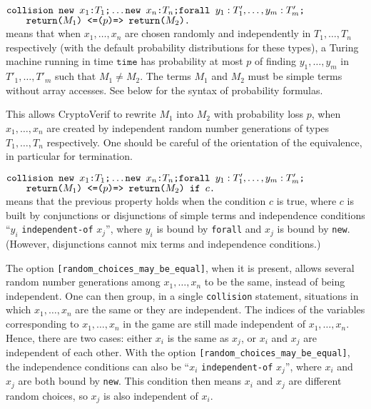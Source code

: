 \begin{itemize}
$\texttt{collision }\texttt{new\ }{x_1}\texttt{:}{T_1}\texttt{;}\ldots 
\texttt{new\ }{x_n}\texttt{:}{T_n}\texttt{;}
\texttt{forall }y_1:T'_1, \ldots, y_m:T'_m\texttt{;}$\\
$\null\qquad \texttt{return(}M_1\texttt{) <=(}p\texttt{)=> return(}M_2\texttt{).}$\\
means that when
$x_1, \ldots, x_n$ are chosen randomly 
and independently in $T_1, \ldots, T_n$ respectively (with the default probability distributions for these types), a Turing machine running in
time $\texttt{time}$ has probability at most $p$ of finding
$y_1, \ldots, y_m$ in $T'_1, \ldots, T'_m$ such that $M_1 \neq M_2$.
%
The terms $M_1$ and $M_2$ must be simple terms without array accesses.
See below for the syntax of probability formulas.

This allows CryptoVerif to rewrite $M_1$ into $M_2$ with probability
loss $p$, when $x_1, \ldots, x_n$ are created by independent random
number generations of types $T_1, \ldots, T_n$ respectively. One
should be careful of the orientation of the equivalence, in particular
for termination.

$\texttt{collision }\texttt{new\ }{x_1}\texttt{:}{T_1}\texttt{;}\ldots 
\texttt{new\ }{x_n}\texttt{:}{T_n}\texttt{;}
\texttt{forall }y_1:T'_1, \ldots, y_m:T'_m\texttt{;}$\\
$\null\qquad \texttt{return(}M_1\texttt{) <=(}p\texttt{)=> return(}M_2\texttt{) if $c$.}$\\
means that the previous property holds when the condition $c$ is true, where
$c$ is built by conjunctions or disjunctions of simple terms and independence conditions ``$y_i$ \texttt{independent-of} $x_j$'',
where $y_i$ is bound by  \texttt{forall} and $x_j$ is bound by \texttt{new}. (However, disjunctions cannot
mix terms and independence conditions.)

The option \texttt{[random\_choices\_may\_be\_equal]}, when it is present, allows several 
random number generations among $x_1, \ldots, x_n$ to be the same, instead of being
independent. One can then group, in a single \texttt{collision} statement, 
situations in which $x_1, \ldots, x_n$ are the same or they are independent.
The indices of the variables corresponding to $x_1, \ldots, x_n$
in the game are still made independent of $x_1, \ldots, x_n$. 
Hence, there are two cases: either $x_i$ is the same as $x_j$, or
$x_i$ and $x_j$ are independent of each other. With the option \texttt{[random\_choices\_may\_be\_equal]}, 
the independence conditions can also be ``$x_i$ \texttt{independent-of} $x_j$'',
where $x_i$ and $x_j$ are both bound by \texttt{new}. This condition
then means $x_i$ and $x_j$ are different random choices, so
$x_j$ is also independent of $x_i$. 


\end{itemize}
